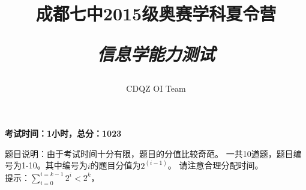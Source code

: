 \documentclass[12pt]{exam}
\begin{document}
\title{成都七中2015级奥赛学科夏令营 \\[2ex] \begin{huge} \itshape  信息学能力测试  \end{huge}}
\author{CDQZ OI Team}
\maketitle
\begin{center}
{\centering
\textbf{考试时间：1小时，总分：1023}}
\end{center}

题目说明：由于考试时间十分有限，题目的分值比较奇葩。
一共10道题，题目编号为1-10。其中编号为$i$的题目分值为$2^{(i-1)}$。
请注意合理分配时间。
\\[2ex] 提示：$\sum_{i=0} ^ {i=k-1} 2^i <2^k$，

\begin{questions}
\pointname{}












\end{questions}
\end{document}
